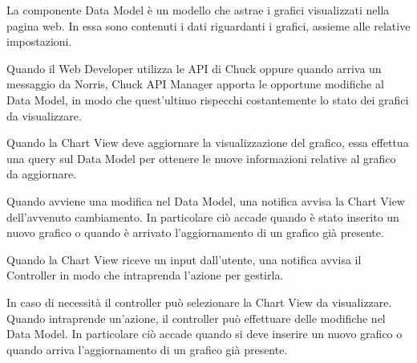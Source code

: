     	La componente Data Model è un modello che astrae i grafici visualizzati nella pagina web. In essa sono contenuti i dati riguardanti i grafici, assieme alle relative impostazioni.
    
	
		Quando il Web Developer utilizza le API di Chuck oppure quando arriva un messaggio da Norris, Chuck API Manager apporta le opportune modifiche al Data Model, in modo che quest'ultimo rispecchi costantemente lo stato dei grafici da visualizzare.

		Quando la Chart View deve aggiornare la visualizzazione del grafico, essa effettua una query sul Data Model per ottenere le nuove informazioni relative al grafico da aggiornare.

		Quando avviene una modifica nel Data Model, una notifica avvisa la Chart View dell'avvenuto cambiamento. In particolare ciò accade quando è stato inserito un nuovo grafico o quando è arrivato l'aggiornamento di un grafico già presente.

		Quando la Chart View riceve un input dall'utente, una notifica avvisa il Controller in modo che intraprenda l'azione per gestirla.

		In caso di necessità il controller può selezionare la Chart View da visualizzare.
		Quando intraprende un'azione, il controller può effettuare delle modifiche nel Data Model. In particolare ciò accade quando si deve inserire un nuovo grafico o quando arriva l'aggiornamento di un grafico già presente.
